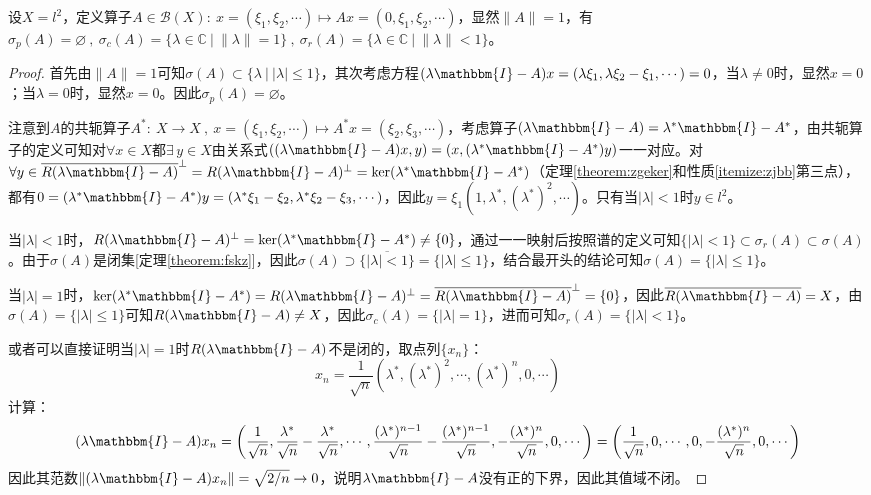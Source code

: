 \begin{example}
\quad 设$X=l^2$，定义算子$A \in \mathscr{B}(X): \ x=(\xi_1,\xi_2,\cdots) \mapsto Ax=(0,\xi_1,\xi_2,\cdots)$，显然$\|A\|=1$，有$\sigma_p(A)=\varnothing \ , \ \sigma_c(A)=\{\lambda\in\mathbb{C} \ | \ \|\lambda\|=1\} \ , \ \sigma_r(A)=\{\lambda\in\mathbb{C} \ | \ \|\lambda\|<1\}$。
\end{example}
\begin{proof}
首先由$\|A\|=1$可知$\sigma(A) \subset \{\lambda \ | \ |\lambda|\leq1\}$，其次考虑方程$(\lambda\mathbbm{I}-A)x=(\lambda\xi_1,\lambda\xi_2-\xi_1,\cdots)=0$，当$\lambda\neq0$时，显然$x=0$；当$\lambda=0$时，显然$x=0$。因此$\sigma_p(A)=\varnothing$。

注意到$A$的共轭算子$A^*: \ X \to X \ , \ x=(\xi_1,\xi_2,\cdots) \mapsto A^*x=(\xi_2,\xi_3,\cdots)$，考虑算子$(\lambda\mathbbm{I}-A)=\lambda^*\mathbbm{I}-A^*$，由共轭算子的定义可知对$\forall x \in X$都$\exists \, y \in X$由关系式$((\lambda\mathbbm{I}-A)x,y)=(x,(\lambda^*\mathbbm{I}-A^*)y)$一一对应。对$\forall y \in \overline{R(\lambda\mathbbm{I}-A)}^{\perp}=R(\lambda\mathbbm{I}-A)^{\perp}=\ker(\lambda^*\mathbbm{I}-A^*)$（定理\ref{theorem:zgeker}和性质\ref{itemize:zjbb}第三点），都有$0=(\lambda^*\mathbbm{I}-A^*)y=(\lambda^*\xi_1-\xi_2,\lambda^*\xi_2-\xi_3,\cdots)$，因此$y=\xi_1(1,\lambda^*,(\lambda^*)^2,\cdots)$。只有当$|\lambda|<1$时$y \in l^2$。

当$|\lambda|<1$时，$R(\lambda\mathbbm{I}-A)^{\perp}=\ker(\lambda^*\mathbbm{I}-A^*)\neq\{0\}$，通过一一映射后按照谱的定义可知$\{|\lambda|<1\} \subset \sigma_r(A)\subset\sigma(A)$。由于$\sigma(A)$是闭集[定理\ref{theorem:fskz}]，因此$\sigma(A) \supset \overline{\{|\lambda|<1\}}=\{|\lambda|\leq1\}$，结合最开头的结论可知$\sigma(A)=\{|\lambda|\leq1\}$。

当$|\lambda|=1$时，$\ker(\lambda^*\mathbbm{I}-A^*)=R(\lambda\mathbbm{I}-A)^{\perp}=\overline{R(\lambda\mathbbm{I}-A)}^{\perp}=\{0\}$，因此$\overline{R(\lambda\mathbbm{I}-A)}=X$，由$\sigma(A)=\{|\lambda|\leq1\}$可知$R(\lambda\mathbbm{I}-A)\neq X$，因此$\sigma_c(A)=\{|\lambda|=1\}$，进而可知$\sigma_r(A)=\{|\lambda|<1\}$。

或者可以直接证明当$|\lambda|=1$时$R(\lambda\mathbbm{I}-A)$不是闭的，取点列$\{x_n\}$：
\[x_n=\frac{1}{\sqrt{n}}\left(\lambda^*,(\lambda^*)^2,\cdots,(\lambda^*)^n,0,\cdots\right)\]
计算：
\[(\lambda\mathbbm{I}-A)x_n=\left(\frac{1}{\sqrt{n}},\frac{\lambda^*}{\sqrt{n}}-\frac{\lambda^*}{\sqrt{n}},\cdots,\frac{(\lambda^*)^{n-1}}{\sqrt{n}}-\frac{(\lambda^*)^{n-1}}{\sqrt{n}},-\frac{(\lambda^*)^n}{\sqrt{n}},0,\cdots\right)=\left(\frac{1}{\sqrt{n}},0,\cdots,0,-\frac{(\lambda^*)^n}{\sqrt{n}},0,\cdots\right)\]
因此其范数$\|(\lambda\mathbbm{I}-A)x_n\|=\sqrt{2/n} \to 0$，说明$\lambda\mathbbm{I}-A$没有正的下界，因此其值域不闭。
\end{proof}

